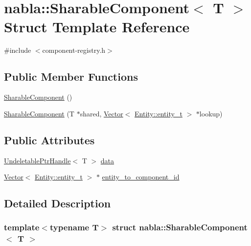 \hypertarget{structnabla_1_1_sharable_component}{}\section{nabla\+::Sharable\+Component$<$ T $>$ Struct Template Reference}
\label{structnabla_1_1_sharable_component}


{\ttfamily \#include $<$component-\/registry.\+h$>$}

\subsection*{Public Member Functions}
\begin{DoxyCompactItemize}
\item 
\mbox{\hyperlink{structnabla_1_1_sharable_component_aa3c361b3a23b20fc318a78eb59b5b827}{Sharable\+Component}} ()
\item 
\mbox{\hyperlink{structnabla_1_1_sharable_component_a66948fd88fd9e72ee9308675527933a9}{Sharable\+Component}} (T $\ast$shared, \mbox{\hyperlink{namespacenabla_a34f7ca8c9af290f9af3ed299236ff959}{Vector}}$<$ \mbox{\hyperlink{structnabla_1_1_entity_a0e7d5826cda759dfeb3a81c8175f3b4d}{Entity\+::entity\+\_\+t}} $>$ $\ast$lookup)
\end{DoxyCompactItemize}
\subsection*{Public Attributes}
\begin{DoxyCompactItemize}
\item 
\mbox{\hyperlink{structnabla_1_1_undeletable_ptr_handle}{Undeletable\+Ptr\+Handle}}$<$ T $>$ \mbox{\hyperlink{structnabla_1_1_sharable_component_a00e7dee9a30a4e54c137748b8ea7f74b}{data}}
\item 
\mbox{\hyperlink{namespacenabla_a34f7ca8c9af290f9af3ed299236ff959}{Vector}}$<$ \mbox{\hyperlink{structnabla_1_1_entity_a0e7d5826cda759dfeb3a81c8175f3b4d}{Entity\+::entity\+\_\+t}} $>$ $\ast$ \mbox{\hyperlink{structnabla_1_1_sharable_component_abdce182855122da5fdd3ad93692a9adf}{entity\+\_\+to\+\_\+component\+\_\+id}}
\end{DoxyCompactItemize}


\subsection{Detailed Description}
\subsubsection*{template$<$typename T$>$\newline
struct nabla\+::\+Sharable\+Component$<$ T $>$}



